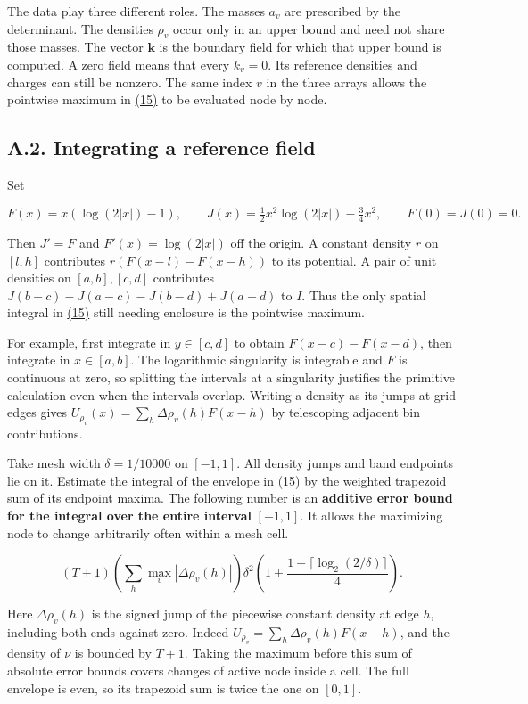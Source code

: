 \documentclass[11pt,a4paper]{article}
\begin{document}
The data play three different roles. The masses \(a_v\) are prescribed by the determinant. The densities \(\rho_v\) occur only in an upper bound and need not share those masses. The vector \(\mathbf k\) is the boundary field for which that upper bound is computed. A zero field means that every \(k_v=0\). Its reference densities and charges can still be nonzero. The same index \(v\) in the three arrays allows the pointwise maximum in \hyperref[eq:15]{(15)} to be evaluated node by node.

\subsection{A.2. Integrating a reference field}\label{a.2.-integrating-a-reference-field}

Set

\[
 F(x)=x(\log(2|x|)-1),\qquad J(x)=\tfrac12x^2\log(2|x|)-\tfrac34x^2,
 \qquad F(0)=J(0)=0 .
\]

Then \(J'=F\) and \(F'(x)=\log(2|x|)\) off the origin. A constant density \(r\) on \([l,h]\) contributes \(r(F(x-l)-F(x-h))\) to its potential. A pair of unit densities on \([a,b],[c,d]\) contributes \(J(b-c)-J(a-c)-J(b-d)+J(a-d)\) to \(I\). Thus the only spatial integral in \hyperref[eq:15]{(15)} still needing enclosure is the pointwise maximum.

For example, first integrate in \(y\in[c,d]\) to obtain \(F(x-c)-F(x-d)\), then integrate in \(x\in[a,b]\). The logarithmic singularity is integrable and \(F\) is continuous at zero, so splitting the intervals at a singularity justifies the primitive calculation even when the intervals overlap. Writing a density as its jumps at grid edges gives \(U_{\rho_v}(x)=\sum_h\Delta\rho_v(h)F(x-h)\) by telescoping adjacent bin contributions.

Take mesh width \(\delta=1/10000\) on \([-1,1]\). All density jumps and band endpoints lie on it. Estimate the integral of the envelope in \hyperref[eq:15]{(15)} by the weighted trapezoid sum of its endpoint maxima. The following number is an \textbf{additive error bound for the integral over the entire interval} \([-1,1]\). It allows the maximizing node to change arbitrarily often within a mesh cell.

\[
 (T+1)\left(\sum_h\max_v|\Delta\rho_v(h)|\right)
 \delta^2\left(1+\frac{1+\lceil\log_2(2/\delta)\rceil}{4}\right).           \tag{26}\label{eq:26}
\]

Here \(\Delta\rho_v(h)\) is the signed jump of the piecewise constant density at edge \(h\), including both ends against zero. Indeed \(U_{\rho_v}=\sum_h\Delta\rho_v(h)F(x-h)\), and the density of \(\nu\) is bounded by \(T+1\). Taking the maximum before this sum of absolute error bounds covers changes of active node inside a cell. The full envelope is even, so its trapezoid sum is twice the one on \([0,1]\).
\end{document}
